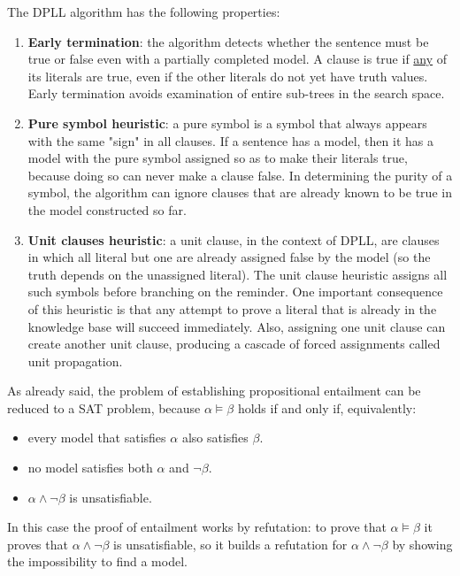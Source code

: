 \documentclass{article}
\begin{document}
\noindent The DPLL algorithm has the following properties:
\begin{enumerate}
    \item \textbf{Early termination}: the algorithm detects whether the sentence must be true or false even with a partially completed model. A clause is true if \underline{any} of its literals are true, even if the other literals do not yet have truth values. Early termination avoids examination of entire sub-trees in the search space.
    \item \textbf{Pure symbol heuristic}: a pure symbol is a symbol that always appears with the same "sign" in all clauses. If a sentence has a model, then it has a model with the pure symbol assigned so as to make their literals true, because doing so can never make a clause false. In determining the purity of a symbol, the algorithm can ignore clauses that are already known to be true in the model constructed so far.
    \item \textbf{Unit clauses heuristic}: a unit clause, in the context of DPLL, are clauses in which all literal but one are already assigned false by the model (so the truth depends on the unassigned literal). The unit clause heuristic assigns all such symbols before branching on the reminder. One important consequence of this heuristic is that any attempt to prove a literal that is already in the knowledge base will succeed immediately. Also, assigning one unit clause can create another unit clause, producing a cascade of forced assignments called unit propagation.   
\end{enumerate}

As already said, the problem of establishing propositional entailment can be reduced to a SAT problem, because \(\alpha \models \beta\) holds if and only if, equivalently:
\begin{itemize}
    \item every model that satisfies \(\alpha\) also satisfies \(\beta\).
    \item no model satisfies both \(\alpha\) and \(\neg \beta\).
    \item \(\alpha \land \neg \beta\) is unsatisfiable.
\end{itemize}

\noindent In this case the proof of entailment works by refutation: to prove that \(\alpha \models \beta\) it proves that \(\alpha \land \neg \beta\) is unsatisfiable, so it builds a refutation for \(\alpha \land \neg \beta\) by showing the impossibility to find a model.  
\end{document}
